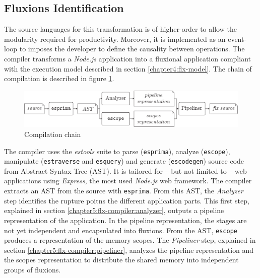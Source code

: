 \subsection{Fluxions Identification} \label{chapter5:flx:compiler}

The source languages for this transformation is of higher-order to allow the modularity required for productivity. 
Moreover, it is implemented as an event-loop to imposes the developer to define the causality between operations.
The compiler transforms a \textit{Node.js} application into a fluxional application compliant with the execution model described in section \ref{chapter4:flx-model}.
The chain of compilation is described in figure \ref{fig:compilation}.

\begin{figure}
  \includegraphics[width=\linewidth]{../resources/compiler-stream.pdf}
  \caption{Compilation chain}
  \label{fig:compilation}
\end{figure}

The compiler uses the \textit{estools} suite to parse (\texttt{esprima}), analyze (\texttt{escope}), manipulate (\texttt{estraverse} and \texttt{esquery}) and generate (\texttt{escodegen}) source code from Abstract Syntax Tree (AST).
It is tailored for -- but not limited to -- web applications using \textit{Express}, the most used \textit{Node.js} web framework.
The compiler extracts an AST from the source with \texttt{esprima}.
From this AST, the \textit{Analyzer} step identifies the rupture poitns the different application parts.%
This first step, explained in section \ref{chapter5:flx-compiler:analyzer}, outputs a pipeline representation of the application.
In the pipeline representation, the stages are not yet independent and encapsulated into fluxions.
From the AST, \texttt{escope} produces a representation of the memory scopes.
The \textit{Pipeliner} step, explained in section \ref{chapter5:flx-compiler:pipeliner}, analyzes the pipeline representation and the scopes representation to distribute the shared memory into independent groups of fluxions.

